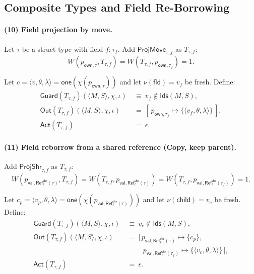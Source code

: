 \documentclass[sigconf]{acmart}
\begin{document}
\subsection{Composite Types and Field Re-Borrowing}
\label{sec:method:composite}

\paragraph{(10) Field projection by move.}
Let $\tau$ be a struct type with field $f:\tau_f$.
Add $\mathsf{ProjMove}_{\tau,f}$ as $T_{\tau,f}$: 
\begin{equation*}
W(p_{\mathsf{own},\tau},T_{\tau,f})=W(T_{\tau,f},p_{\mathsf{own},\tau_f})=1.
\end{equation*}

Let $c=\langle v,\theta,\lambda\rangle=\mathsf{one}(\chi(p_{\mathsf{own},\tau}))$ and let $\nu(\mathsf{fld})=v_f$ be fresh.
Define:
\begin{align*}
\mathsf{Guard}(T_{\tau,f})(\langle M,S\rangle,\chi,\iota)
&~\equiv~ v_f\notin \mathsf{Ids}(M,S),\\
\mathsf{Out}(T_{\tau,f})(\langle M,S\rangle,\chi,\iota)
&~=~ [\,p_{\mathsf{own},\tau_f}\mapsto \{\langle v_f,\theta,\lambda\rangle\}\,],\\
\mathsf{Act}(T_{\tau,f})
&~=~ \epsilon.
\end{align*}

\paragraph{(11) Field reborrow from a shared reference (Copy, keep parent).}
Add $\mathsf{ProjShr}_{\tau,f}$ as $T_{\tau,f}$:
\begin{equation*}
    W(p_{\mathsf{val},\mathsf{Ref}^{\mathsf{shr}}_{\ell}(\tau)},T_{\tau,f})=W(T_{\tau,f},p_{\mathsf{val},\mathsf{Ref}^{\mathsf{shr}}_{\ell}(\tau)})=W(T_{\tau,f},p_{\mathsf{val},\mathsf{Ref}^{\mathsf{shr}}_{\ell}(\tau_f)})=1.
\end{equation*}

Let $c_p=\langle v_p,\theta,\lambda\rangle=\mathsf{one}(\chi(p_{\mathsf{val},\mathsf{Ref}^{\mathsf{shr}}_{\ell}(\tau)}))$
and let $\nu(\mathsf{child})=v_c$ be fresh. Define:
\begin{align*}
\mathsf{Guard}(T_{\tau,f})(\langle M,S\rangle,\chi,\iota)
&~\equiv~ v_c\notin \mathsf{Ids}(M,S),\\
\mathsf{Out}(T_{\tau,f})(\langle M,S\rangle,\chi,\iota)
&~=~ [\,p_{\mathsf{val},\mathsf{Ref}^{\mathsf{shr}}_{\ell}(\tau)}\mapsto \{c_p\},\\
&\qquad\ \ p_{\mathsf{val},\mathsf{Ref}^{\mathsf{shr}}_{\ell}(\tau_f)}\mapsto \{\langle v_c,\theta,\lambda\rangle\}\,],\\
\mathsf{Act}(T_{\tau,f})
&~=~ \epsilon.
\end{align*}
\end{document}
